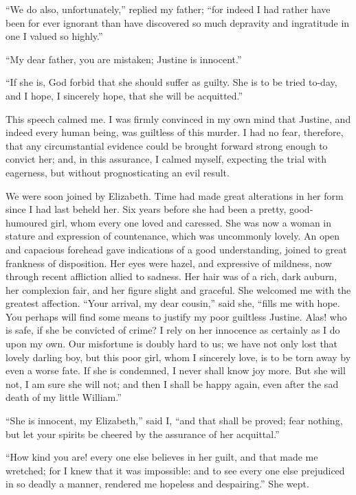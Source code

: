``We do also, unfortunately,'' replied
my father; ``for indeed I had rather
have been for ever ignorant than
have discovered so much depravity and
ingratitude in one I valued so highly.''

``My dear father, you are mistaken;
Justine is innocent.''

``If she is, God forbid that she
should suffer as guilty. She is to be
tried to-day, and I hope, I sincerely
hope, that she will be acquitted.''

This speech calmed me. I was firmly
convinced in my own mind that Justine,
and indeed every human being, was
guiltless of this murder. I had no
fear, therefore, that any circumstantial
evidence could be brought forward
strong enough to convict her; and, in
this assurance, I calmed myself, expecting
the trial with eagerness, but without
prognosticating an evil result.

We were soon joined by Elizabeth.
Time had made great alterations in her
form since I had last beheld her. Six
years before she had been a pretty,
good-humoured girl, whom every one
loved and caressed. She was now a
woman in stature and expression of
countenance, which was uncommonly
lovely. An open and capacious forehead
gave indications of a good understanding,
joined to great frankness of
disposition. Her eyes were hazel, and
expressive of mildness, now through
recent affliction allied to sadness. Her
hair was of a rich, dark auburn, her
complexion fair, and her figure slight
and graceful. She welcomed me with
the greatest affection. ``Your arrival,
my dear cousin,'' said she, ``fills me
with hope. You perhaps will find
some means to justify my poor guiltless
Justine. Alas! who is safe, if she
be convicted of crime? I rely on her
innocence as certainly as I do upon my
own. Our misfortune is doubly hard
to us; we have not only lost that lovely
darling boy, but this poor girl, whom I
sincerely love, is to be torn away by
even a worse fate. If she is condemned,
I never shall know joy more. But she
will not, I am sure she will not; and
then I shall be happy again, even after
the sad death of my little William.''

``She is innocent, my Elizabeth,''
said I, ``and that shall be proved; fear
nothing, but let your spirits be cheered
by the assurance of her acquittal.''

``How kind you are! every one else
believes in her guilt, and that made me
wretched; for I knew that it was impossible:
and to see every one else prejudiced
in so deadly a manner, rendered
me hopeless and despairing.'' She
wept.


